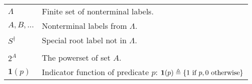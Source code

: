 \begin{table}[h]
\begin{tabular}{ll}
    $\Lambda$ & Finite set of nonterminal labels.  \\
    $A, B, \dots$ & Nonterminal labels from $\Lambda$.  \\
    $S^{\dagger}$ & Special root label not in $\Lambda$.  \\
    & \\

    $2^A$ & The powerset of set $A$.  \\
    $\mathbf{1}(p)$  & Indicator function of predicate $p$: $\mathbf{1}(p) \triangleq \{ 1 \text{ if } p, 0 \text{ otherwise}\}$ \\

  \end{tabular}

\end{table}

% 
